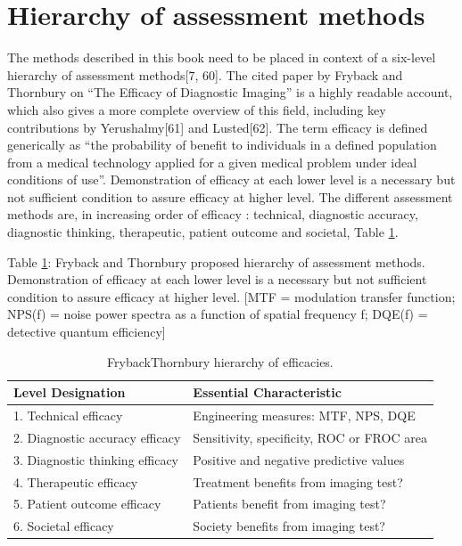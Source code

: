 \documentclass[
]{book}
\begin{document}
\hypertarget{hierarchy-of-assessment-methods}{%
\section{Hierarchy of assessment methods}\label{hierarchy-of-assessment-methods}}

The methods described in this book need to be placed in context of a six-level hierarchy of assessment methods{[}7, 60{]}. The cited paper by Fryback and Thornbury on ``The Efficacy of Diagnostic Imaging'' is a highly readable account, which also gives a more complete overview of this field, including key contributions by Yerushalmy{[}61{]} and Lusted{[}62{]}. The term efficacy is defined generically as ``the probability of benefit to individuals in a defined population from a medical technology applied for a given medical problem under ideal conditions of use''. Demonstration of efficacy at each lower level is a necessary but not sufficient condition to assure efficacy at higher level. The different assessment methods are, in increasing order of efficacy : technical, diagnostic accuracy, diagnostic thinking, therapeutic, patient outcome and societal, Table \ref{tab:FrybackThornbury}.

Table \ref{tab:FrybackThornbury}: Fryback and Thornbury proposed hierarchy of assessment methods. Demonstration of efficacy at each lower level is a necessary but not sufficient condition to assure efficacy at higher level. {[}MTF = modulation transfer function; NPS(f) = noise power spectra as a function of spatial frequency f; DQE(f) = detective quantum efficiency{]}

\begin{table}

\caption{\label{tab:FrybackThornbury}FrybackThornbury hierarchy of efficacies.}
\centering
\begin{tabular}[t]{l|l}
\hline
Level Designation & Essential Characteristic\\
\hline
1. Technical efficacy & Engineering measures: MTF, NPS, DQE\\
\hline
2. Diagnostic accuracy efficacy & Sensitivity, specificity, ROC or FROC area\\
\hline
3. Diagnostic thinking efficacy & Positive and negative predictive values\\
\hline
4. Therapeutic efficacy & Treatment benefits from imaging test?\\
\hline
5. Patient outcome efficacy & Patients benefit from imaging test?\\
\hline
6. Societal efficacy & Society benefits from imaging test?\\
\hline
\end{tabular}
\end{table}
\end{document}

